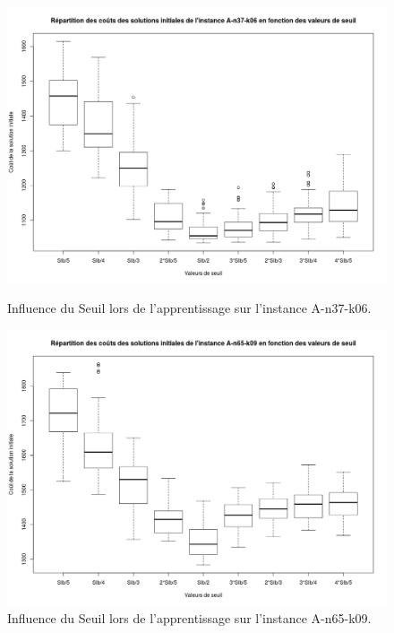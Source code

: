 \documentclass[a4paper,11pt]{article}%
\begin{document}
\begin{figure}[p]


      \centering
      \includegraphics[scale=0.32]{InfluenceSeuilA3706}
        
      \caption{Influence du Seuil lors de l'apprentissage sur l'instance A-n37-k06.}
      \label{InfSA3706}

        \centering
        \includegraphics[scale=0.32]{InfluenceSeuilA6509}
        
        \caption{Influence du Seuil lors de l'apprentissage sur l'instance A-n65-k09.}
        \label{InfSA6509}


\end{figure}
\end{document}
